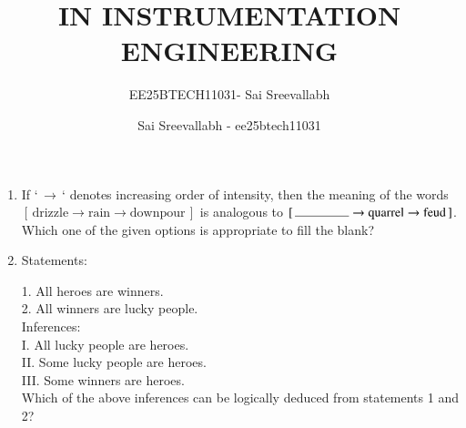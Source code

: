 \documentclass[journal,12pt,onecolumn]{IEEEtran}
\title{IN  INSTRUMENTATION ENGINEERING}
\author{EE25BTECH11031- Sai Sreevallabh}
\author{Sai Sreevallabh - ee25btech11031}
\theoremstyle{remark}
\begin{document}
\maketitle

\begin{enumerate}

\item If `$\,\rightarrow\,$` denotes increasing order of intensity, then the meaning of the words $[\,\text{drizzle} \rightarrow \text{rain} \rightarrow \text{downpour}\,]$ is analogous to $[\,\rule{1.5cm}{0.4pt} \rightarrow \text{quarrel} \rightarrow \text{feud}\,]$. Which one of the given options is appropriate to fill the blank?
\par\hfill{}
    \begin{enumerate}
    \end{enumerate}

\item Statements:

1. All heroes are winners.\\
2. All winners are lucky people.\\
Inferences: \\
I. All lucky people are heroes.\\
II. Some lucky people are heroes.\\
III. Some winners are heroes.\\
Which of the above inferences can be logically deduced from statements 1 and 2?
\par\hfill{}
    \begin{enumerate}
    \end{enumerate}


\end{enumerate}
\end{document}
